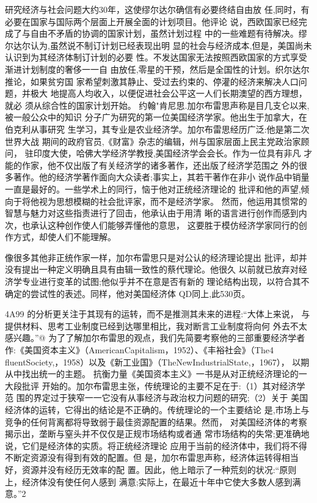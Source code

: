 研究经济与社会问题大约30年，这使缪尔达尔确信有必要终结自由放
任,同时，有必要在国家与国际两个层面上开展全面的计划项目。他评论
说，西欧国家已经完成了与自由不矛盾的协调的国家计划，虽然计划过程
中的一些难题有待解决。缪尔达尔认为,虽然说不制订计划已经表现出明
显的社会与经济成本,但是，美国尚未认识到为其经济体制订计划的必要
性。不发达国家无法按照西欧国家的方式享受渐进计划制度的奢侈一一自
由放任,零星的干预，然后是全国性的计划。织尔达尔推论，如果贫穷国
家希望刺激其静止、受过去约束的、停灌的经济来解决人口问题，并极大
地提高人均收入，以便促进社会公平这一人们长期澳望的西方理想，就必
须从综合性的国家计划开始。
约翰"肯尼思.加尔布雷思声称是目几支仑以来,被一般公众中的知识
分子广为研究的第一位美国经济学家。他出生于加拿大，在伯克利从事研究
生学习，其专业是农业经济学。加尔布雷思经历广泛:他是第二次世界大战
期间的政府官员,《财富》杂志的编辑，州与国家层面上民主党政治家顾问，
驻印度大使，哈佛大学经济学教授,美国经济学会会长。作为一位具有非凡
才能的作家，他不仅出版了有关经济学的诸多著作，还出版了经济学范围之
外的很多著作。他的经济学著作面向大众读者;事实上，其若干著作在非小
说作品中销量一直是最好的。一些学术上的同行，恼于他对正统经济理论的
批评和他的声望,倾向于将他视为思想模糊的社会批评家，而不是经济学家。
然而，他运用其惯常的智慧与魅力对这些指责进行了回击，他承认由于用清
晰的语言进行创作而感到内次，也承认这种创作使人们能够弄懂他的意思，
这要胜于模仿经济学家同行的创作方式，却使人们不能理解。

像很多其他非正统作家一样，加尔布雷思只是对公认的经济理论提出
批评，却并没有提出一种定义明确且具有由辑一致性的蔡代理论。他很久
以前就已放弃对经济学专业进行变革的试图;他似乎并不在意是否有新的
理论结构出现，以符合其不确定的尝试性的表述。同样，他对美国经济体
QD同上,此530页。

4A99
的分析更关注于其现有的运转，而不是推测其未来的进程:“大体上来说，
与提供材料、思考工业制度已经到达哪里相比，我对断言工业制度将向何
外去不太感兴趣。”@
为了了解加尔布雷思的观点，我们先简要考察他的三部重要经济学者
作:《美国资本主义》（AmericanCapitalism，1952）、《丰裕社会》（The4
fluentSociety,，1958）以及《新工业国》（TheNewIndustrialState,，1967），
以期从中找出统一的主题。
抗衡力量《美国资本主义》一书是从对正统经济理论的一大段批评
开始的。加尔布雷思主张，传统理论的主要不足在于:（1）其对经济学范
围的界定过于狭窄一一它没有从事经济与政治权力问题的研究;（2）关于
美国经济体的运转，它得出的结论是不正确的。传统理论的一个主要结论
是,市场上与竞争的任何背离都将导致弱于最佳资源配置的结果。然而，
对美国经济体的考察揭示出，垄断与窒头并不仅仅是正规市场结构或者通
常市场结构的失常;更准确地说，它们是经济体的实质。将正统经济理论
应用于当前的经济体中，我们将不得不断定资源没有得到有效的配置。但
是，加尔布雷思声称，经济体运转得相当好，资源并没有经历无效率的配
置。因此，他上暗示了一种荒刻的状况:“原则上，经济体没有使任何人感到
满意;实际上，在最近十年中它使大多数人感到满意。”2

